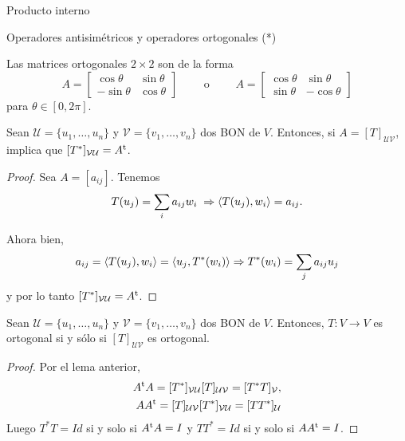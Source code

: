 \begin{chapter}{Producto interno}
\begin{section}{Operadores antisim\'etricos y operadores ortogonales (*)}
        \begin{ejemplo*}
            Las matrices ortogonales $2 \times 2$ son de la forma
            $$
            A = \begin{bmatrix}
            \cos\theta &\sin\theta \\
            -\sin\theta & \cos\theta
            \end{bmatrix} \qquad\text{ o }\qquad 
            A = \begin{bmatrix}
            \cos\theta &\sin\theta \\
            \sin\theta & -\cos\theta
            \end{bmatrix}
            $$
            para $\theta \in [0,2\pi]$. 
        \end{ejemplo*}
        
        \begin{lema}\label{lema-th-6.5}
            Sean $\mathcal U = \{u_1,\ldots,u_n\}$ y $\mathcal V = \{v_1,\ldots,v_n\}$ dos BON de $V$. Entonces, si $A=[T]_{\mathcal U \mathcal V}$, implica que $[T^*]_{\mathcal V \mathcal U} = A^{{\operatorname{t}}}$.
        \end{lema}
        \begin{proof} Sea $A = [a_{ij}]$. 
        Tenemos  
        $$T(u_j) = \sum_i a_{ij}w_i \; \Rightarrow\langle T(u_j),w_i \rangle = a_{ij}.$$ 
        
        Ahora bien, 
        $$a_{ij} = \langle T(u_j),w_i \rangle =\langle u_j,T^*(w_i) \rangle \Rightarrow  T^*(w_i) = \sum_j a_{ij} u_j$$ y por lo tanto  $[T^*]_{\mathcal V \mathcal U} = A^{{\operatorname{t}}}$. 
            
        \end{proof}
        
        \begin{teorema} \label{th-6.5}Sean $\mathcal U = \{u_1,\ldots,u_n\}$ y $\mathcal V = \{v_1,\ldots,v_n\}$ dos BON de $V$. Entonces, $T:V\to V$  es ortogonal si y sólo si $[T]_{\mathcal U \mathcal V}$ es ortogonal. 
        \end{teorema}
        \begin{proof}
            
            Por el lema anterior, 
            \begin{align*}
                    A^{{\operatorname{t}}}A = [T^*]_{\mathcal V \mathcal U} [T]_{\mathcal U \mathcal V} = [T^*T]_{\mathcal V},\\
                    AA^{{\operatorname{t}}} = [T]_{\mathcal U \mathcal V}[T^*]_{\mathcal V \mathcal U} = [TT^*]_{\mathcal U}
            \end{align*} 
            Luego $T^*T = Id$ si y solo si $A^{{\operatorname{t}}}A=I$ y  $TT^* = Id$ si y solo si $AA^{{\operatorname{t}}}=I$.
        \end{proof}
        

\end{section}
\end{chapter}

